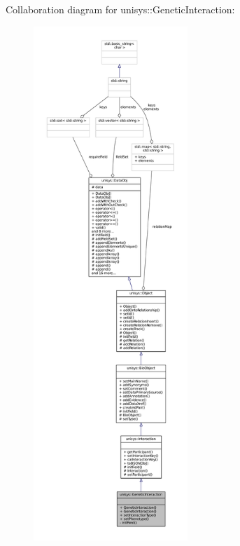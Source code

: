 Collaboration diagram for unisys\-:\-:Genetic\-Interaction\-:
\nopagebreak
\begin{figure}[H]
\begin{center}
\leavevmode
\includegraphics[height=550pt]{classunisys_1_1GeneticInteraction__coll__graph}
\end{center}
\end{figure}
